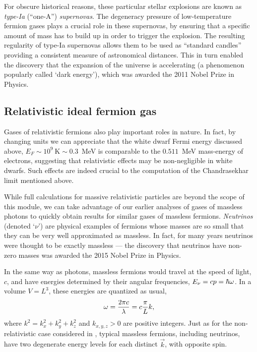 For obscure historical reasons, these particular stellar explosions are known as \textit{type-{\textrm I}a} (``one-A'') \textit{supernovas}.
The degeneracy pressure of low-temperature fermion gases plays a crucial role in these supernovas, by ensuring that a specific amount of mass has to build up in order to trigger the explosion.
The resulting regularity of type-{\textrm I}a supernovas allows them to be used as ``standard candles'' providing a consistent measure of astronomical distances.
This in turn enabled the discovery that the expansion of the universe is accelerating (a phenomenon popularly called `dark energy'), which was awarded the 2011 Nobel Prize in Physics.



\subsection{Relativistic ideal fermion gas}
Gases of relativistic fermions also play important roles in nature.
In fact, by changing units we can appreciate that the white dwarf Fermi energy discussed above, $E_F \sim 10^9~\text{K} \sim 0.3$~MeV is comparable to the $0.511$~MeV mass-energy of electrons, suggesting that relativistic effects may be non-negligible in white dwarfs. %
Such effects are indeed crucial to the computation of the Chandrasekhar limit mentioned above.

While full calculations for massive relativistic particles are beyond the scope of this module, we can take advantage of our earlier analyses of gases of massless photons to quickly obtain results for similar gases of massless fermions.
\textit{Neutrinos} (denoted `$\nu$') are physical examples of fermions whose masses are so small that they can be very well approximated as massless.
In fact, for many years neutrinos were thought to be exactly massless --- the discovery that neutrinos have non-zero masses was awarded the 2015 Nobel Prize in Physics.

In the same way as photons, massless fermions would travel at the speed of light, $c$, and have energies determined by their angular frequencies, $E_{\nu} = cp = \hbar \omega$.
In a volume $V = L^3$, these energies are quantized as usual,
\begin{equation*}
  \omega = \frac{2\pi c}{\lambda} = c \frac{\pi}{L} k,
\end{equation*}
where $k^2 = k_x^2 + k_y^2 + k_z^2$ and $k_{x, y, z} > 0$ are positive integers.
Just as for the non-relativistic case considered in , typical massless fermions, including neutrinos, have two degenerate energy levels for each distinct $\vec k$, with opposite spin.

